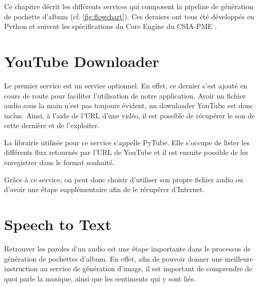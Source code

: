 

\lstset{style=mystyle}

Ce chapitre décrit les différents services qui composent la pipeline de génération de pochette d'album (cf. \ref{fig:flowchart}).
Ces derniers ont tous été développés en Python et suivent les spécifications du Core Engine du CSIA-PME \cite{CSIA-PME}.

\section{YouTube Downloader}
Le premier service est un service optionnel. En effet, ce dernier s'est ajouté en cours de route pour faciliter l'utilisation de notre application.
Avoir un fichier audio sous la main n'est pas toujours évident, nn downloader YouTube est donc inclus. Ainsi, à l'aide de l'URL d'une vidéo, il est possible de récupérer le son de cette dernière et de l'exploiter.

La librairie utilisée pour ce service s'appelle PyTube. Elle s'occupe de lister les différents flux retournés par l'URL de YouTube et il est ensuite possible de les enregistrer dans le format souhaité. 

Grâce à ce service, on peut donc choisir d'utiliser son propre fichier audio ou d'avoir une étape supplémentaire afin de le récupérer d'Internet.

\section{Speech to Text}

Retrouver les paroles d'un audio est une étape importante dans le processus de génération de pochettes d'album. En effet, afin de pouvoir donner une meilleure instruction au service de génération d'image, il est important de comprendre de quoi parle la musique, ainsi que les sentiments qui y sont liés. 

